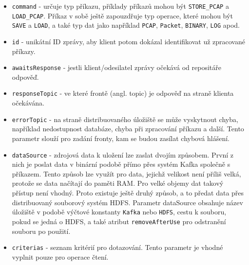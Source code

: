 \begin{itemize}
    
    
    \item \texttt{command} - určuje typ příkazu, příklady příkazů mohou být \texttt{STORE\_PCAP} a \texttt{LOAD\_PCAP}. Příkaz v sobě ještě zapouzdřuje typ operace, které mohou být \texttt{SAVE} a \texttt{LOAD}, a také typ dat jako například \texttt{PCAP}, \texttt{Packet}, \texttt{BINARY}, \texttt{LOG} apod.
    
    \item \texttt{id} - unikátní ID zprávy, aby klient potom dokázal identifikovat už zpracované příkazy.
    
    \item \texttt{awaitsResponse} - jestli klient/odesilatel zprávy očekává od repositáře odpověď.
    
    \item \texttt{responseTopic} - ve které frontě (angl. topic) je odpověď na straně klienta očekávána.
    
    \item \texttt{errorTopic} - na straně distribuovaného úložiště se může vyskytnout chyba, například nedostupnost databáze, chyba při zpracování příkazu a další. Tento parametr slouží pro zadání fronty, kam se budou zasílat chybová hlášení.
    
    \item \texttt{dataSource} - zdrojová data k uložení lze zaslat dvojím způsobem. První z nich je poslat data v binární podobě přímo přes systém Kafka společně s příkazem. Tento způsob lze využít pro data, jejichž velikost není příliš velká, protože se data načítají do paměti RAM. Pro velké objemy dat takový přístup není vhodný. Proto existuje ještě druhý způsob, a to předat data přes distribuovaný souborový systém HDFS. Parametr dataSource obsahuje název úložiště v podobě výčtové konstanty \texttt{Kafka} nebo \texttt{HDFS}, cestu k souboru, pokud se jedná o HDFS, a také atribut \texttt{removeAfterUse} pro odstranění souboru po použití.
    
    \item \texttt{criterias} - seznam kritérií pro dotazování. Tento parametr je vhodné vyplnit pouze pro operace čtení.
\end{itemize}

